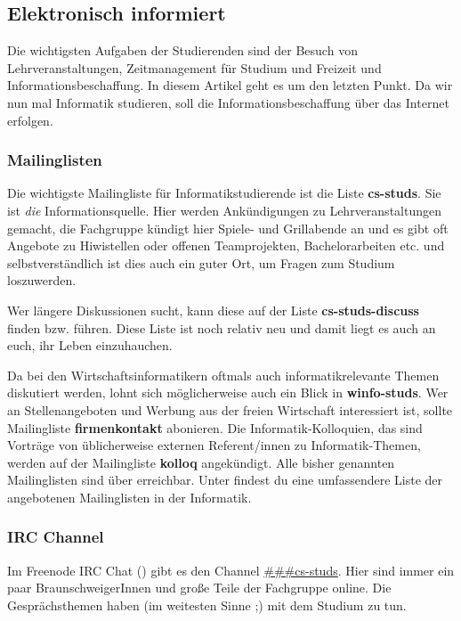 
\subsection{Elektronisch informiert}
	\label{elekinf}
	Die wichtigsten Aufgaben der Studierenden sind der Besuch von Lehrveranstaltungen, Zeitmanagement für Studium und Freizeit und Informationsbeschaffung. In diesem Artikel geht es um den letzten Punkt. Da wir nun mal Informatik studieren, soll die Informationsbeschaffung über das Internet erfolgen.

	\subsubsection*{Mailinglisten}
	\label{mailinglisten}
		Die wichtigste Mailingliste für Informatikstudierende ist die Liste \textbf{cs-studs}. Sie ist \emph{die} Informationsquelle. Hier werden Ankündigungen zu Lehrveranstaltungen gemacht, die Fachgruppe kündigt hier Spiele- und Grillabende an und es gibt oft Angebote zu Hiwistellen oder offenen Teamprojekten, Bachelorarbeiten etc. und selbstverständlich ist dies auch ein guter Ort, um Fragen zum Studium loszuwerden.

		Wer längere Diskussionen sucht, kann diese auf der Liste \textbf{cs-studs-discuss} finden bzw. führen. Diese Liste ist noch relativ neu und damit liegt es auch an euch, ihr Leben einzuhauchen.

		Da bei den Wirtschaftsinformatikern oftmals auch informatikrelevante Themen diskutiert werden, lohnt sich möglicherweise auch ein Blick in \textbf{winfo-studs}. 
		Wer an Stellenangeboten und Werbung aus der freien
		Wirtschaft interessiert ist, sollte Mailingliste
		\textbf{firmenkontakt} abonieren. Die
		Informatik-Kolloquien, das sind Vorträge von
		üblicherweise externen Referent/innen zu Informatik-Themen,
		werden auf der Mailingliste \textbf{kolloq} angekündigt.
		Alle bisher genannten Mailinglisten sind über
		erreichbar. Unter
		findest du eine umfassendere Liste der angebotenen Mailinglisten in der Informatik.

	\subsubsection*{IRC Channel}
		Im Freenode IRC Chat () gibt es den Channel \url{###cs-studs}. Hier sind immer ein paar BraunschweigerInnen und große Teile der Fachgruppe online. Die Gesprächsthemen haben (im weitesten Sinne ;) mit dem Studium zu tun.


